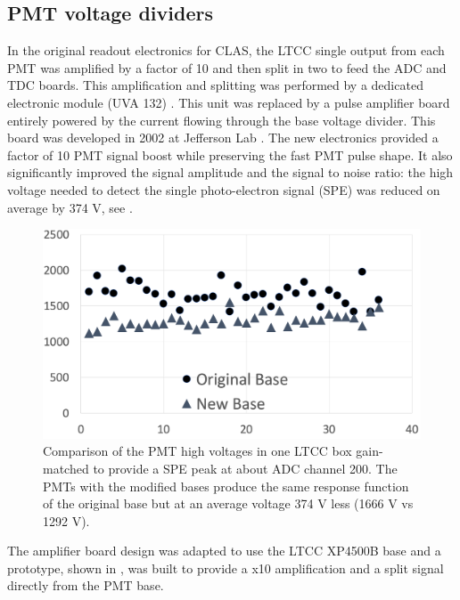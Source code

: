 \subsection{PMT voltage dividers}

In the original readout electronics for CLAS, the LTCC single output from each PMT was amplified by a factor of 10
and then split in two to feed the ADC and TDC boards. This amplification and splitting was performed
by a dedicated electronic module (UVA 132) \cite{Adams:2001kk}. This unit was replaced by a pulse amplifier board entirely powered by
the current flowing through the base voltage divider. This board was developed in 2002 at Jefferson Lab \cite{Popov:2003mj}.
The new electronics provided a factor of 10 PMT signal boost while preserving the fast PMT pulse shape.
It also significantly improved the signal amplitude and the signal to noise ratio: the high voltage needed to detect
the single photo-electron signal (SPE) was reduced on average by 374 V, see .

\begin{figure}
	\centering
	\includegraphics[width=0.99\columnwidth,keepaspectratio]{img/pmtHVImprovement.png}
	\caption{Comparison of the PMT high voltages in one LTCC box gain-matched to provide a SPE peak at about ADC channel 200.
            The PMTs with the modified bases produce the same response function of the original
			base but at an average voltage 374 V less (1666 V vs 1292 V).}
	\label{fig:pmtHVImprovement}
\end{figure}

The amplifier board design was adapted to use the LTCC XP4500B base and a prototype, shown in , was built to provide a x10
amplification and a split signal directly from the PMT base.

